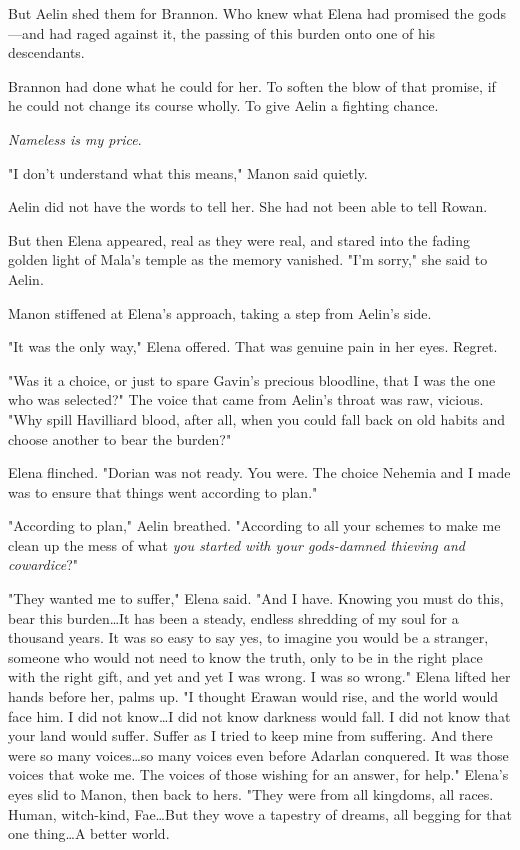 But Aelin shed them for Brannon.
Who knew what Elena had promised the gods---and had raged against it, the passing of this burden onto one of his descendants.

Brannon had done what he could for her.
To soften the blow of that promise, if he could not change its course wholly.
To give Aelin a fighting chance.

\emph{Nameless is my price}.

"I don't understand what this means," Manon said quietly.

Aelin did not have the words to tell her.
She had not been able to tell Rowan.

But then Elena appeared, real as they were real, and stared into the fading golden light of Mala's temple as the memory vanished.
"I'm sorry," she said to Aelin.

Manon stiffened at Elena's approach, taking a step from Aelin's side.

"It was the only way," Elena offered.
That was genuine pain in her eyes.
Regret.

"Was it a choice, or just to spare Gavin's precious bloodline, that I was the one who was selected?"
The voice that came from Aelin's throat was raw, vicious.
"Why spill Havilliard blood, after all, when you could fall back on old habits and choose another to bear the burden?"

Elena flinched.
"Dorian was not ready.
You were.
The choice Nehemia and I made was to ensure that things went according to plan."

"According to plan," Aelin breathed.
"According to all your schemes to make me clean up the mess of what \emph{you started with your gods-damned thieving and cowardice}?"

"They wanted me to suffer," Elena said.
"And I have.
Knowing you must do this, bear this burden\ldots It has been a steady, endless shredding of my soul for a thousand years.
It was so easy to say yes, to imagine you would be a stranger, someone who would not need to know the truth, only to be in the right place with the right gift, and yet  and yet I was wrong.
I was so wrong."
Elena lifted her hands before her, palms up.
"I thought Erawan would rise, and the world would face him.
I did not know\ldots I did not know darkness would fall.
I did not know that your land would suffer.
Suffer as I tried to keep mine from suffering.
And there were so many voices\ldots so many voices even before Adarlan conquered.
It was those voices that woke me.
The voices of those wishing for an answer, for help."
Elena's eyes slid to Manon, then back to hers.
"They were from all kingdoms, all races.
Human, witch-kind, Fae\ldots But they wove a tapestry of dreams, all begging for that one thing\ldots A better world.

